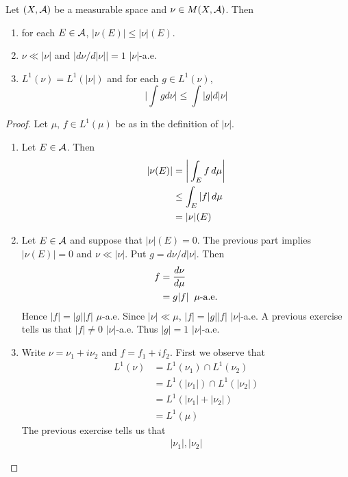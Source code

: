 \documentclass{book}
\begin{document}
	\begin{ex}  
		Let $(X, \mathcal{A})$ be a measurable space and $\nu \in M(X, \mathcal{A})$. Then 
		
		\begin{enumerate}
			\item for each $E \in \mathcal{A}$, $|\nu(E)| \leq |\nu|(E)$. 
			\item $\nu \ll |\nu|$ and $\big|d \nu /d |\nu|\big| = 1$ $|\nu|$-a.e.
			\item $L^1(\nu) = L^1(|\nu|)$ and for each $g \in L^1(\nu)$, $$ \bigg|\int g d\nu \bigg| \leq \int |g|d |\nu|$$
		\end{enumerate}
	\end{ex}
	
	\begin{proof}
		Let $\mu$, $f \in L^1(\mu)$ be as in the definition of $|\nu|$.
		\begin{enumerate}
			\item Let $E \in \mathcal{A}$. Then 
			\begin{align*}
				|\nu(E)| 
				& = \bigg|\int_E f \, d \mu\bigg|\\
				& \leq \int_E |f| \, d \mu\\
				&= |\nu|(E)
			\end{align*}
			\item Let $E \in \mathcal{A}$ and suppose that $|\nu|(E)=0$. The previous part implies $|\nu(E)|=0$ and $\nu \ll |\nu|$. Put $g = d \nu / d|\nu|$. Then 
			\begin{align*}
				f 
				&= \frac{d\nu}{d\mu}\\
				&= g|f| \hspace{2mm }\mu\text{-a.e.}
			\end{align*}
			Hence $|f| = |g||f|$ $\mu$-a.e. Since $|\nu| \ll \mu$, $|f| = |g||f|$ $|\nu|$-a.e. A previous exercise tells us that $|f| \neq 0$ $|\nu|$-a.e. Thus $|g|=1$ $|\nu|$-a.e.\\
			\item Write $\nu = \nu_1 + i\nu_2$ and $f = f_1 + if_2$. First we observe that
			\begin{align*}
				L^1(\nu)
				&= L^1(\nu_1) \cap L^1(\nu_2) \\
				&= L^1(|\nu_1|) \cap L^1(|\nu_2|)\\
				&= L^1(|\nu_1| + |\nu_2|)\\
				&= L^1(\mu)
			\end{align*}
			The previous exercise tells us that 
			\begin{align*}
				|\nu_1|, |\nu_2| 

\end{align*}
\end{enumerate}
\end{proof}
\end{document}
